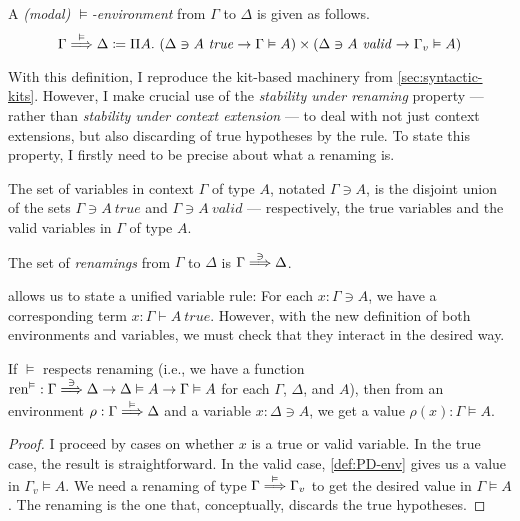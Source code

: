 \begin{definition}\label{def:PD-env}
  A \emph{(modal) $\vDash$-environment} from $\Gamma$ to $\Delta$ is given as
  follows.
  \[
    \Gamma \env\vDash \Delta \coloneqq
    \Pi A.~\plr{\Delta \ni A~\mathit{true} \to \Gamma \vDash A}
    \times \plr{\Delta \ni A~\mathit{valid} \to \Gamma_v \vDash A}
  \]
\end{definition}

With this definition, I reproduce the kit-based machinery from
\cref{sec:syntactic-kits}.
However, I make crucial use of the \emph{stability under renaming} property ---
rather than \emph{stability under context extension} --- to deal with not just
context extensions, but also discarding of true hypotheses by the
 rule.
To state this property, I firstly need to be precise about what a renaming is.

\begin{definition}\label{def:PD-var}
  The set of variables in context $\Gamma$ of type $A$, notated $\Gamma \ni A$,
  is the disjoint union of the sets $\Gamma \ni A~\mathit{true}$ and
  $\Gamma \ni A~\mathit{valid}$ --- respectively, the true variables and the
  valid variables in $\Gamma$ of type $A$.

  The set of \emph{renamings} from $\Gamma$ to $\Delta$ is
  $\Gamma \stackrel{\ni}\Longrightarrow \Delta$.
\end{definition}

 allows us to state a unified variable rule: For each
$x : \Gamma \ni A$, we have a corresponding term
$x : \Gamma \vdash A~\mathit{true}$.
However, with the new definition of both environments and variables, we must
check that they interact in the desired way.

\begin{lemma}[lookup]\label{thm:PD-lookup}
  If $\vDash$ respects renaming (i.e., we have a function
  \mbox{$\mathrm{ren}^\vDash :
  \Gamma \stackrel{\ni}\Longrightarrow \Delta \to \Delta \vDash A \to \Gamma \vDash A$}
  for each $\Gamma$, $\Delta$, and $A$), then
  from an environment $\rho : \Gamma \stackrel{\vDash}\Longrightarrow \Delta$ and a variable
  $x : \Delta \ni A$, we get a value $\rho(x) : \Gamma \vDash A$.
\end{lemma}
\begin{proof}
  I proceed by cases on whether $x$ is a true or valid variable.
  In the true case, the result is straightforward.
  In the valid case, \cref{def:PD-env} gives us a value in $\Gamma_v \vDash A$.
  We need a renaming of type $\Gamma \stackrel{\vDash}\Longrightarrow \Gamma_v$ to get the desired
  value in $\Gamma \vDash A$.
  The renaming is the one that, conceptually, discards the true hypotheses.
\end{proof}

